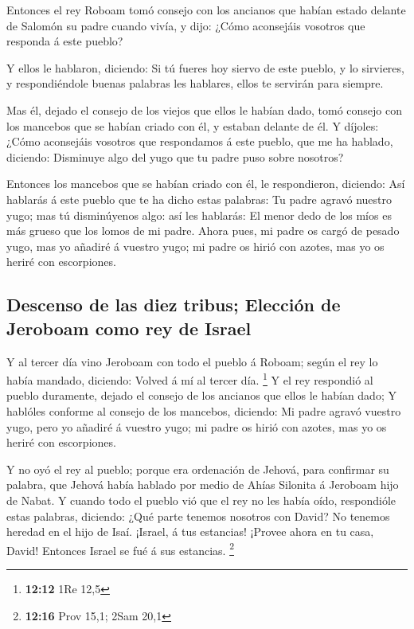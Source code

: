  Entonces el rey Roboam tomó consejo con los ancianos que
habían estado delante de Salomón su padre cuando vivía, y dijo: ¿Cómo
aconsejáis vosotros que responda á este pueblo?

 Y ellos le hablaron, diciendo: Si tú fueres hoy siervo de
este pueblo, y lo sirvieres, y respondiéndole buenas palabras les
hablares, ellos te servirán para siempre.

 Mas él, dejado el consejo de los viejos que ellos le
habían dado, tomó consejo con los mancebos que se habían criado con él,
y estaban delante de él.  Y díjoles: ¿Cómo aconsejáis
vosotros que respondamos á este pueblo, que me ha hablado, diciendo:
Disminuye algo del yugo que tu padre puso sobre nosotros?

 Entonces los mancebos que se habían criado con él, le
respondieron, diciendo: Así hablarás á este pueblo que te ha dicho estas
palabras: Tu padre agravó nuestro yugo; mas tú disminúyenos algo: así
les hablarás: El menor dedo de los míos es más grueso que los lomos de
mi padre.  Ahora pues, mi padre os cargó de pesado yugo,
mas yo añadiré á vuestro yugo; mi padre os hirió con azotes, mas yo os
heriré con escorpiones.

\hypertarget{descenso-de-las-diez-tribus-elecciuxf3n-de-jeroboam-como-rey-de-israel}{%
\subsection{Descenso de las diez tribus; Elección de Jeroboam como rey
de
Israel}\label{descenso-de-las-diez-tribus-elecciuxf3n-de-jeroboam-como-rey-de-israel}}

 Y al tercer día vino Jeroboam con todo el pueblo á
Roboam; según el rey lo había mandado, diciendo: Volved á mí al tercer
día. \footnote{\textbf{12:12} 1Re 12,5}  Y el rey
respondió al pueblo duramente, dejado el consejo de los ancianos que
ellos le habían dado;  Y hablóles conforme al consejo de
los mancebos, diciendo: Mi padre agravó vuestro yugo, pero yo añadiré á
vuestro yugo; mi padre os hirió con azotes, mas yo os heriré con
escorpiones.

 Y no oyó el rey al pueblo; porque era ordenación de
Jehová, para confirmar su palabra, que Jehová había hablado por medio de
Ahías Silonita á Jeroboam hijo de Nabat.  Y cuando todo
el pueblo vió que el rey no les había oído, respondióle estas palabras,
diciendo: ¿Qué parte tenemos nosotros con David? No tenemos heredad en
el hijo de Isaí. ¡Israel, á tus estancias! ¡Provee ahora en tu casa,
David! Entonces Israel se fué á sus estancias. \footnote{\textbf{12:16}
  Prov 15,1; 2Sam 20,1}


